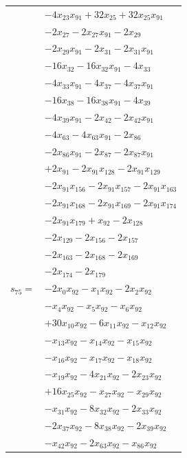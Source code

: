 \begin{longtable}{@{}r@{\;}l@{}}
 & \(\displaystyle -4x_{23}x_{91} +32x_{25} +32x_{25}x_{91}\) \\
 & \(\displaystyle -2x_{27} -2x_{27}x_{91} -2x_{29}\) \\
 & \(\displaystyle -2x_{29}x_{91} -2x_{31} -2x_{31}x_{91}\) \\
 & \(\displaystyle -16x_{32} -16x_{32}x_{91} -4x_{33}\) \\
 & \(\displaystyle -4x_{33}x_{91} -4x_{37} -4x_{37}x_{91}\) \\
 & \(\displaystyle -16x_{38} -16x_{38}x_{91} -4x_{39}\) \\
 & \(\displaystyle -4x_{39}x_{91} -2x_{42} -2x_{42}x_{91}\) \\
 & \(\displaystyle -4x_{63} -4x_{63}x_{91} -2x_{86}\) \\
 & \(\displaystyle -2x_{86}x_{91} -2x_{87} -2x_{87}x_{91}\) \\
 & \(\displaystyle +2x_{91} -2x_{91}x_{128} -2x_{91}x_{129}\) \\
 & \(\displaystyle -2x_{91}x_{156} -2x_{91}x_{157} -2x_{91}x_{163}\) \\
 & \(\displaystyle -2x_{91}x_{168} -2x_{91}x_{169} -2x_{91}x_{174}\) \\
 & \(\displaystyle -2x_{91}x_{179} +x_{92} -2x_{128}\) \\
 & \(\displaystyle -2x_{129} -2x_{156} -2x_{157}\) \\
 & \(\displaystyle -2x_{163} -2x_{168} -2x_{169}\) \\
 & \(\displaystyle -2x_{174} -2x_{179}\) \\[3pt]
\(s_{75}=\) & \(\displaystyle -2x_{0}x_{92} -x_{1}x_{92} -2x_{2}x_{92}\) \\
 & \(\displaystyle -x_{4}x_{92} -x_{5}x_{92} -x_{6}x_{92}\) \\
 & \(\displaystyle +30x_{10}x_{92} -6x_{11}x_{92} -x_{12}x_{92}\) \\
 & \(\displaystyle -x_{13}x_{92} -x_{14}x_{92} -x_{15}x_{92}\) \\
 & \(\displaystyle -x_{16}x_{92} -x_{17}x_{92} -x_{18}x_{92}\) \\
 & \(\displaystyle -x_{19}x_{92} -4x_{21}x_{92} -2x_{23}x_{92}\) \\
 & \(\displaystyle +16x_{25}x_{92} -x_{27}x_{92} -x_{29}x_{92}\) \\
 & \(\displaystyle -x_{31}x_{92} -8x_{32}x_{92} -2x_{33}x_{92}\) \\
 & \(\displaystyle -2x_{37}x_{92} -8x_{38}x_{92} -2x_{39}x_{92}\) \\
 & \(\displaystyle -x_{42}x_{92} -2x_{63}x_{92} -x_{86}x_{92}\) \\

\end{longtable}
